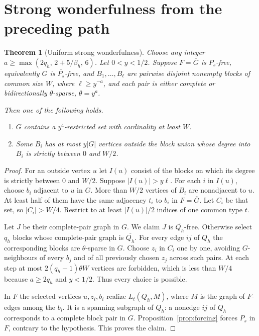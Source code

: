 \documentclass[11pt,a4paper]{article}
\newtheorem{theorem}{Theorem}[section]
\theoremstyle{definition}
\theoremstyle{remark}
\numberwithin{equation}{section}
\begin{document}
\section{Strong wonderfulness from the preceding path}\label{sec:wonder}
\begin{theorem}[Uniform strong wonderfulness]\label{thm:wonder}
Choose any integer \(a\ge \max (2 q_{h},\, 2+5/\beta_{h},\, 6)\). Let \(0<y<1/2\). Suppose \(F=\overline G\) is \(P_s\)-free, equivalently \(G\) is \(\overline{P_s}\)-free, and \(B_{1},\ldots,B_{\ell}\) are pairwise disjoint nonempty blocks of common size \(W\), where \(\ell\ge\allowbreak y^{-a}\), and each pair is either complete or bidirectionally \(\theta\)-sparse, \(\theta=y^{a}\).

Then one of the following holds.
\begin{enumerate}[label=(\Alph*)]
\item \(G\) contains a \(y^{4}\)-restricted set with cardinality at least \(W\).
\item Some \(B_{i}\) has at most \(y|G|\) vertices outside the block union whose degree into \(B_{i}\) is strictly between \(0\) and \(W/2\).
\end{enumerate}
\end{theorem}\begin{proof}
For an outside vertex \(u\) let \(I(u)\) consist of the blocks on which its degree is strictly between \(0\) and \(W/2\). Suppose \(|I(u)|>y \ell\). For each \(i\) in \(I(u)\), choose \(b_{i}\) adjacent to \(u\) in \(G\). More than \(W/2\) vertices of \(B_{i}\) are nonadjacent to \(u\). At least half of them have the same adjacency \(t_{i}\) to \(b_{i}\) in \(F=\overline{G}\). Let \(C_{i}\) be that set, so \(|C_{i}|>W/4\). Restrict to at least \(|I(u)|/2\) indices of one common type \(t\).

Let \(J\) be their complete-pair graph in \(G\). We claim \(J\) is \(\overline{Q_{h}}\)-free. Otherwise select \(q_{h}\) blocks whose complete-pair graph is \(\overline{Q_{h}}\). For every edge \(ij\) of \(Q_{h}\) the corresponding blocks are \(\theta\)-sparse in \(G\). Choose \(z_{i}\) in \(C_{i}\) one by one, avoiding \(G\)-neighbours of every \(b_{j}\) and of all previously chosen \(z_{j}\) across such pairs. At each step at most \(2(q_{h}-1)\theta W\) vertices are forbidden, which is less than \(W/4\) because \(a\ge\allowbreak 2q_{h}\) and \(y<1/2\). Thus every choice is possible.

In \(F\) the selected vertices \(u,\allowbreak z_{i},\allowbreak b_{i}\) realize \(L_{t}(Q_{h},\allowbreak M)\), where \(M\) is the graph of \(F\)-edges among the \(b_{i}\). It is a spanning subgraph of \(Q_{h}\): a nonedge \(ij\) of \(Q_{h}\) corresponds to a complete block pair in \(G\). Proposition~\ref{prop:forcing} forces \(P_{s}\) in \(F\), contrary to the hypothesis. This proves the claim.


\end{proof}
\end{document}
